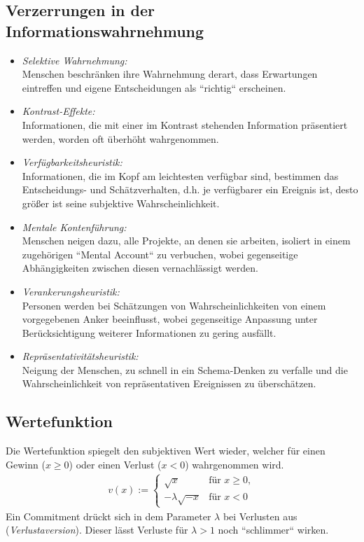 \documentclass[12pt,a4paper]{scrartcl}
\begin{document}
\subsection{Verzerrungen in der Informationswahrnehmung \cite{vonNitzsch:211553}}
\begin{itemize}
	\item \textit{Selektive Wahrnehmung:}\\
	Menschen beschränken ihre Wahrnehmung derart, dass Erwartungen eintreffen und eigene Entscheidungen als ``richtig`` erscheinen.
	\item \textit{Kontrast-Effekte:}\\
	Informationen, die mit einer im Kontrast stehenden Information präsentiert werden, worden oft überhöht wahrgenommen.
	\item \textit{Verfügbarkeitsheuristik:}\\
	Informationen, die im Kopf am leichtesten verfügbar sind, bestimmen das Entscheidungs- und Schätzverhalten, d.h. je verfügbarer ein Ereignis ist, desto größer ist seine subjektive Wahrscheinlichkeit.
	\item \textit{Mentale Kontenführung:}\\
	Menschen neigen dazu, alle Projekte, an denen sie arbeiten, isoliert in einem zugehörigen ``Mental Account`` zu verbuchen, wobei gegenseitige Abhängigkeiten zwischen diesen vernachlässigt werden.
	\item \textit{Verankerungsheuristik:}\\
	Personen werden bei Schätzungen von Wahrscheinlichkeiten von einem vorgegebenen Anker beeinflusst, wobei gegenseitige Anpassung unter Berücksichtigung weiterer Informationen zu gering ausfällt.
	\item \textit{Repräsentativitätsheuristik:}\\
	Neigung der Menschen, zu schnell in ein Schema-Denken zu verfalle und die Wahrscheinlichkeit von repräsentativen Ereignissen zu überschätzen.
\end{itemize}

\subsection{Wertefunktion}
Die Wertefunktion spiegelt den subjektiven Wert wieder, welcher für einen Gewinn ($ x \geq 0 $) oder einen Verlust ($ x < 0 $) wahrgenommen wird.
\begin{align*}
	v(x) := \begin{cases}
	\sqrt{x} & \text{für } x\geq 0,\\
	-\lambda\sqrt{-x} & \text{für } x < 0
	\end{cases}
\end{align*}
Ein Commitment drückt sich in dem Parameter $ \lambda $ bei Verlusten aus (\textit{Verlustaversion}). Dieser lässt Verluste für $ \lambda > 1 $ noch ``schlimmer`` wirken.
\end{document}
